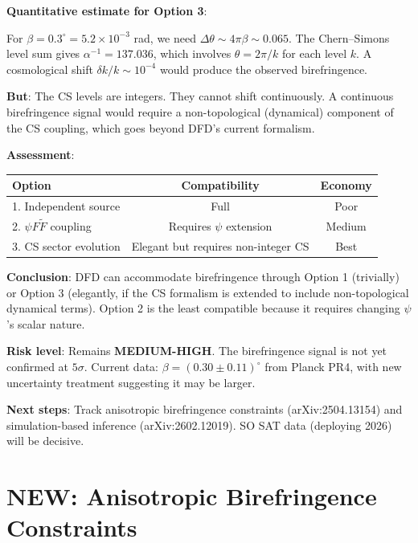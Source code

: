 \documentclass[11pt,a4paper]{article}
\newcommand{\NEW}{\textcolor{dfdblue}{\textbf{NEW}}}
\begin{document}
\begin{tcolorbox}[colback=red!5!white, colframe=red!60!black,
  title={CRITICAL: Can DFD Accommodate $\beta \neq 0$?}]
\textbf{Quantitative estimate for Option 3}:

For $\beta = 0.3^\circ = 5.2 \times 10^{-3}$ rad, we need $\Delta\theta \sim 4\pi \beta \sim 0.065$. The Chern--Simons level sum gives $\alpha^{-1} = 137.036$, which involves $\theta = 2\pi/k$ for each level $k$. A cosmological shift $\delta k / k \sim 10^{-4}$ would produce the observed birefringence.

\textbf{But}: The CS levels are integers. They cannot shift continuously. A continuous birefringence signal would require a non-topological (dynamical) component of the CS coupling, which goes beyond DFD's current formalism.

\textbf{Assessment}:
\begin{center}
\begin{tabular}{lcc}
\toprule
\textbf{Option} & \textbf{Compatibility} & \textbf{Economy} \\
\midrule
1. Independent source & Full & Poor \\
2. $\psi F \tilde{F}$ coupling & Requires $\psi$ extension & Medium \\
3. CS sector evolution & Elegant but requires non-integer CS & Best \\
\bottomrule
\end{tabular}
\end{center}

\textbf{Conclusion}: DFD can accommodate birefringence through Option 1 (trivially) or Option 3 (elegantly, if the CS formalism is extended to include non-topological dynamical terms). Option 2 is the least compatible because it requires changing $\psi$'s scalar nature.

\textbf{Risk level}: Remains \textbf{MEDIUM-HIGH}. The birefringence signal is not yet confirmed at $5\sigma$. Current data: $\beta = (0.30 \pm 0.11)^\circ$ from Planck PR4, with new uncertainty treatment suggesting it may be larger.

\textbf{Next steps}: Track anisotropic birefringence constraints (arXiv:2504.13154) and simulation-based inference (arXiv:2602.12019). SO SAT data (deploying 2026) will be decisive.
\end{tcolorbox}

\section{\NEW: Anisotropic Birefringence Constraints}
\end{document}
